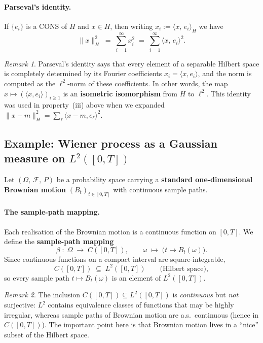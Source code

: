 \documentclass[11pt]{article}
\theoremstyle{definition}
\theoremstyle{remark}
\newtheorem{remark}{Remark}
\begin{document}
\paragraph{Parseval's identity.}

If $\{e_i\}$ is a CONS of $H$ and $x \in H$,
then writing $x_i := \langle x,\, e_i \rangle_H$ we have
\[
    \|x\|_H^2
    \;=\;
    \sum_{i=1}^{\infty} x_i^2
    \;=\;
    \sum_{i=1}^{\infty}
    \langle x,\, e_i \rangle^2.
\]

\begin{remark}
Parseval's identity says that every element of a separable Hilbert
space is completely determined by its Fourier coefficients
$x_i = \langle x, e_i\rangle$, and the norm is computed as
the $\ell^2$-norm of these coefficients.
In other words, the map $x \mapsto (\langle x, e_i\rangle)_{i\ge 1}$
is an \textbf{isometric isomorphism} from $H$ to $\ell^2$.
This identity was used in property~(iii) above when we expanded
$\|x - m\|_H^2 = \sum_\ell \langle x - m, e_\ell\rangle^2$.
\end{remark}

\subsection*{Example: Wiener process as a Gaussian measure on $L^2([0,T])$}

Let $(\Omega,\,\mathcal{F},\,P)$ be a probability space carrying a
\textbf{standard one-dimensional Brownian motion} $(B_t)_{t\in[0,T]}$
with continuous sample paths.

\paragraph{The sample-path mapping.}

Each realisation of the Brownian motion is a continuous function
on $[0,T]$.  We define the \textbf{sample-path mapping}
\[
    \beta \;\colon\; \Omega \;\longrightarrow\; C([0,T]),
    \qquad
    \omega \;\longmapsto\;
    \bigl(t \mapsto B_t(\omega)\bigr).
\]
Since continuous functions on a compact interval are square-integrable,
\[
    C([0,T]) \;\subseteq\; L^2([0,T])
    \qquad \text{(Hilbert space)},
\]
so every sample path $t \mapsto B_t(\omega)$ is an element of
$L^2([0,T])$.

\begin{remark}
The inclusion $C([0,T]) \subseteq L^2([0,T])$ is \emph{continuous}
but \emph{not} surjective: $L^2$ contains equivalence classes of
functions that may be highly irregular, whereas sample paths of
Brownian motion are a.s.\ continuous (hence in $C([0,T])$).
The important point here is that Brownian motion lives in a
``nice'' subset of the Hilbert space.
\end{remark}
\end{document}
